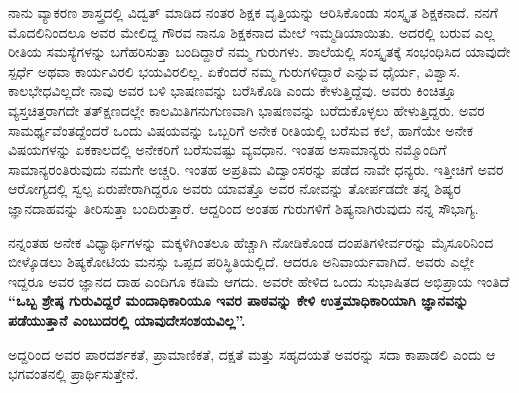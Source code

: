 {ನಾನು ವ್ಯಾಕರಣ ಶಾಸ್ತ್ರದಲ್ಲಿ ವಿದ್ವತ್ ಮಾಡಿದ ನಂತರ ಶಿಕ್ಷಕ ವೃತ್ತಿಯನ್ನು ಆರಿಸಿ\-ಕೊಂಡು ಸಂಸ್ಕೃತ ಶಿಕ್ಷಕನಾದೆ. ನನಗೆ ಮೊದಲಿನಿಂದಲೂ ಅವರ ಮೇಲಿದ್ದ ಗೌರವ ನಾನೂ ಶಿಕ್ಷಕನಾದ ಮೇಲೆ ಇಮ್ಮಡಿಯಾಯಿತು. ಅದರಲ್ಲಿ ಬರುವ ಎಲ್ಲ ರೀತಿಯ ಸಮಸ್ಯೆ\-ಗಳನ್ನು ಬಗೆಹರಿಸುತ್ತಾ ಬಂದಿದ್ದಾರೆ ನಮ್ಮ ಗುರುಗಳು. ಶಾಲೆಯಲ್ಲಿ ಸಂಸ್ಕೃತಕ್ಕೆ ಸಂಭಂಧಿಸಿದ ಯಾವುದೇ ಸ್ಪರ್ಧೆ ಅಥವಾ ಕಾರ್ಯವಿರಲಿ ಭಯವಿರಲಿಲ್ಲ. ಏಕೆಂದರೆ ನಮ್ಮ ಗುರುಗಳಿದ್ದಾರೆ ಎನ್ನುವ ಧೈರ್ಯ, ವಿಶ್ವಾಸ. ಕಾಲಭೇಧವಿಲ್ಲದೇ ನಾವು ಅವರ ಬಳಿ ಭಾಷಣವನ್ನು ಬರೆಸಿಕೊಡಿ ಎಂದು ಕೇಳುತ್ತಿದ್ದೆವು. ಅವರು ಕಿಂಚಿತ್ತೂ ವ್ಯಸ್ತಚಿತ್ತ\-ರಾಗದೇ ತತ್ಕ್ಷಣದಲ್ಲೇ ಕಾಲಮಿತಿಗನುಗುಣವಾಗಿ ಭಾಷಣವನ್ನು ಬರೆದುಕೊಳ್ಳಲು ಹೇಳುತ್ತಿದ್ದರು. ಅವರ ಸಾಮರ್ಥ್ಯವೆಂತದ್ದೆಂದರೆ ಒಂದು ವಿಷಯವನ್ನು ಒಬ್ಬರಿಗೆ ಅನೇಕ ರೀತಿಯಲ್ಲಿ ಬರೆಸುವ ಕಲೆ, ಹಾಗೆಯೇ ಅನೇಕ ವಿಷಯಗಳನ್ನು ಏಕಕಾಲದಲ್ಲಿ ಅನೇಕರಿಗೆ ಬರೆಸುವಷ್ಟು ವ್ಯವಧಾನ. ಇಂತಹ ಅಸಾಮಾನ್ಯರು ನಮ್ಮೊಂದಿಗೆ ಸಾಮಾನ್ಯರಂತಿರು\-ವುದು ನಮಗೇ ಅಚ್ಚರಿ. ಇಂತಹ ಅಪ್ರತಿಮ ವಿದ್ವಾಂಸರನ್ನು ಪಡೆದ ನಾವೇ ಧನ್ಯರು. ಇತ್ತೀಚಿಗೆ ಅವರ ಆರೋಗ್ಯದಲ್ಲಿ ಸ್ವಲ್ಪ ಏರುಪೇರಾಗಿದ್ದರೂ ಅವರು ಯಾವತ್ತೊ ಅವರ ನೋವನ್ನು ತೋರ್ಪಡದೇ ತನ್ನ ಶಿಷ್ಯರ ಜ್ಞಾನದಾಹವನ್ನು ತೀರಿಸುತ್ತಾ ಬಂದಿರುತ್ತಾರೆ. ಆದ್ದರಿಂದ ಅಂತಹ ಗುರುಗಳಿಗೆ ಶಿಷ್ಯನಾಗಿರುವುದು ನನ್ನ ಸೌಭಾಗ್ಯ.
	
ನನ್ನಂತಹ ಅನೇಕ ವಿಧ್ಯಾರ್ಥಿಗಳನ್ನು ಮಕ್ಕಳಿಗಿಂತಲೂ ಹೆಚ್ಚಾಗಿ ನೋಡಿಕೊಂಡ ದಂಪತಿಗಳೀರ್ವರನ್ನು ಮೈಸೂರಿನಿಂದ ಬೀಳ್ಕೊಡಲು ಶಿಷ್ಯಕೋಟಿಯ ಮನಸ್ಸು ಒಪ್ಪದ ಪರಿಸ್ಥಿತಿಯಲ್ಲಿದೆ. ಆದರೂ ಅನಿವಾರ್ಯವಾಗಿದೆ. ಅವರು ಎಲ್ಲೇ ಇದ್ದರೂ ಅವರ ಜ್ಞಾನದ ದಾಹ ಎಂದಿಗೂ ಕಡಿಮೆ ಆಗದು. ಅವರೇ ಹೇಳಿದ ಒಂದು ಸುಭಾಷಿತದ ಅಭಿಪ್ರಾಯ ಇಂತಿದೆ   \enginline{---}   \textbf{“ಒಬ್ಬ ಶ್ರೇಷ್ಠ ಗುರುವಿದ್ದರೆ ಮಂದಾಧಿಕಾರಿಯೂ ಇವರ ಪಾಠವನ್ನು ಕೇಳಿ ಉತ್ತಮಾಧಿಕಾರಿಯಾಗಿ ಜ್ಞಾನವನ್ನು ಪಡೆಯುತ್ತಾನೆ ಎಂಬುದರಲ್ಲಿ ಯಾವುದೇ\break ಸಂಶಯವಿಲ್ಲ”.}

ಅದ್ದರಿಂದ ಅವರ ಪಾರದರ್ಶಕತೆ, ಪ್ರಾಮಾಣಿಕತೆ, ದಕ್ಷತೆ ಮತ್ತು ಸಹೃದಯತೆ ಅವರನ್ನು ಸದಾ ಕಾಪಾಡಲಿ ಎಂದು ಆ ಭಗವಂತನಲ್ಲಿ ಪ್ರಾರ್ಥಿಸುತ್ತೇನೆ.

\articleend
}

